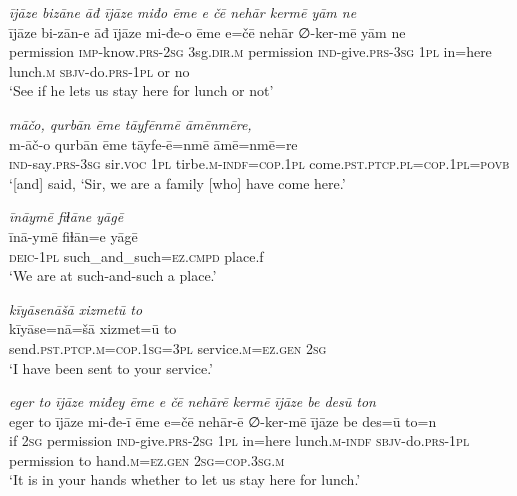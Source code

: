 \ea \label{PM.9}
\textit{ījāze bizāne āđ ījāze miđo ēme e čē nehār kermē yām ne} \\ 
\gll ījāze bi-zān-e āđ ījāze mi-đe-o ēme e=čē nehār ∅-ker-mē yām ne \\ 
 permission \textsc{imp-}know\textsc{.prs}-\textsc{2sg} 3sg\textsc{.dir}\textsc{.m} permission \textsc{ind-}give\textsc{.prs}\textsc{-3sg} \textsc{1pl} in=here lunch\textsc{.m} \textsc{sbjv-}do\textsc{.prs}\textsc{-1pl} or no \\ 
\glt `See if he lets us stay here for lunch or not'
\z 
 
\ea \label{PM.11}
\textit{māčo, qurbān ēme tāyfēnmē āmēnmēre,} \\ 
\gll m-āč-o qurbān ēme tāyfe-ē=nmē āmē=nmē=re \\ 
 \textsc{ind-}say\textsc{.prs}\textsc{-3sg} sir.\textsc{voc} \textsc{1pl} tirbe\textsc{.m}\textsc{-indf}\textsc{=cop}\textsc{.1pl} come\textsc{.pst}\textsc{.ptcp}\textsc{.pl}\textsc{=cop}\textsc{.1pl}\textsc{=\textsc{povb}} \\ 
\glt `[and] said, ‘Sir, we are a family [who] have come here.'
\z 
 
\ea \label{PM.12}
\textit{īnāymē fiɫāne yāgē} \\ 
\gll īnā-ymē fiɫān=e yāgē \\ 
 \textsc{deic-1pl} such\_and\_such\textsc{=ez}\textsc{.cmpd} place.f \\ 
\glt `We are at such-and-such a place.'
\z 
 
\ea \label{PM.13}
\textit{kīyāsenāšā xizmetū to} \\ 
\gll kīyāse=nā=šā xizmet=ū to \\ 
 send\textsc{.pst}\textsc{.ptcp}\textsc{.m}\textsc{=cop}\textsc{.\textsc{1sg}}\textsc{=3pl} service\textsc{.m}\textsc{\textsc{=ez.gen}} \textsc{2sg} \\ 
\glt `I have been sent to your service.'
\z 
 
\ea \label{PM.14}
\textit{eger to ījāze miđey ēme e čē nehārē kermē ījāze be desū ton} \\ 
\gll eger to ījāze mi-đe-ī ēme e=čē nehār-ē ∅-ker-mē ījāze be des=ū to=n \\ 
 if \textsc{2sg} permission \textsc{ind-}give\textsc{.prs}-\textsc{2sg} \textsc{1pl} in=here lunch\textsc{.m}\textsc{-indf} \textsc{sbjv-}do\textsc{.prs}\textsc{-1pl} permission to hand\textsc{.m}\textsc{\textsc{=ez.gen}} \textsc{2sg}\textsc{=cop}\textsc{.3sg}\textsc{.m} \\ 
\glt `It is in your hands whether to let us stay here for lunch.'
\z 
 
